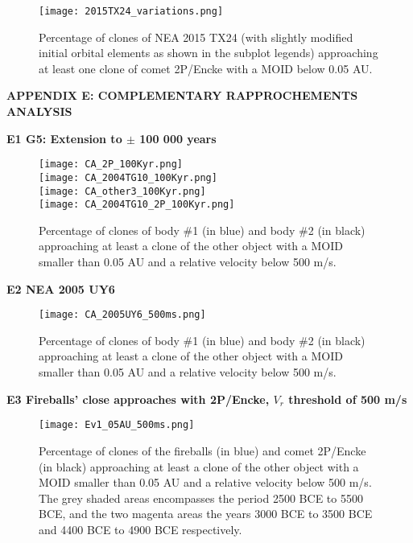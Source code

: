 \documentclass[a4paper,11pt]{article}
\begin{document}
\begin{figure*}[!ht]
  \centering
  \texttt{[image: 2015TX24\_variations.png]}
  \caption{Percentage of clones of NEA 2015 TX24 (with slightly modified initial orbital elements as shown in the subplot legends) approaching at least one clone of comet 2P/Encke with a MOID below 0.05 AU.}
  \label{fig:2015TX24_variations}
\end{figure*}

\newpage
\textbf{APPENDIX E: COMPLEMENTARY RAPPROCHEMENTS ANALYSIS}\\ \label{appendix:additional_rapprochements} 

\textbf{E1  G5: Extension to $\pm$ 100 000 years} \label{sec:100Kyr}\\

\begin{figure*}[!ht]
  \centering
  \texttt{[image: CA\_2P\_100Kyr.png]}\\
  \texttt{[image: CA\_2004TG10\_100Kyr.png]}\\
  \texttt{[image: CA\_other3\_100Kyr.png]}\\
  \texttt{[image: CA\_2004TG10\_2P\_100Kyr.png]}\\
  \caption{Percentage of clones of body \#1 (in blue) and body \#2 (in black) approaching at least a clone of the other object with a MOID smaller than 0.05 AU and a relative velocity below 500 m/s. }
  \label{fig:Main5_100Kyr}
\end{figure*}

\newpage
\textbf{E2  NEA 2005 UY6}\\

\begin{figure*}[!ht]
  \centering
  \texttt{[image: CA\_2005UY6\_500ms.png]}\\
  \caption{Percentage of clones of body \#1 (in blue) and body \#2 (in black) approaching at least a clone of the other object with a MOID smaller than 0.05 AU and a relative velocity below 500 m/s. }
  \label{fig:2005UY6}
\end{figure*}

\textbf{E3  Fireballs' close approaches with 2P/Encke, $V_r$ threshold of 500 m/s}\\

\begin{figure*}[!ht]
  \centering
  \texttt{[image: Ev1\_05AU\_500ms.png]}
  \caption{Percentage of clones of the fireballs (in blue) and comet 2P/Encke (in black) approaching at least a clone of the other object with a MOID smaller than 0.05 AU and a relative velocity below 500 m/s. The grey shaded areas encompasses the period 2500 BCE to 5500 BCE, and the two magenta areas the years 3000 BCE to 3500 BCE and 4400 BCE to 4900 BCE respectively.}
  \label{fig:fireballs_with_peak_500ms}
\end{figure*}
\end{document}

